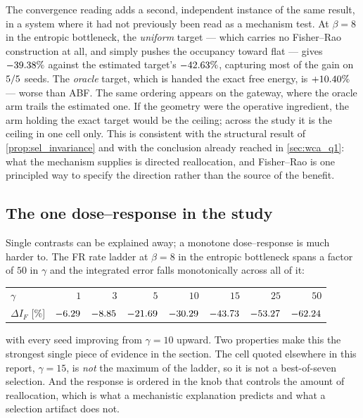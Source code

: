 The convergence reading adds a second, independent instance of the same result, in a system
where it had not previously been read as a mechanism test. At $\beta=8$ in the entropic
bottleneck, the \emph{uniform} target --- which carries no Fisher--Rao construction at all, and
simply pushes the occupancy toward flat --- gives $-39.38\%$ against the estimated target's
$-42.63\%$, capturing most of the gain on $5/5$ seeds. The
\emph{oracle} target, which is handed the exact free energy, is $+10.40\%$ --- worse than
ABF. The same ordering appears on the gateway, where the oracle arm trails the estimated one.
If the geometry were the operative ingredient, the arm holding the exact target would be the
ceiling; across the study it is the ceiling in one cell only. This is consistent with the
structural result of \cref{prop:sel_invariance} and with the conclusion already reached in
\cref{sec:wca_q1}: what the mechanism supplies is directed reallocation, and Fisher--Rao is one
principled way to specify the direction rather than the source of the benefit.

\subsection{The one dose--response in the study}
\label{sec:conv_dose}

Single contrasts can be explained away; a monotone dose--response is much harder to. The FR
rate ladder at $\beta=8$ in the entropic bottleneck spans a factor of $50$ in $\gamma$ and the
integrated error falls monotonically across all of it:

\begin{center}\small
\begin{tabular}{@{}lrrrrrrr@{}}
\toprule
$\gamma$ & $1$ & $3$ & $5$ & $10$ & $15$ & $25$ & $50$ \\
$\Delta I_F$ [\%] & $-6.29$ & $-8.85$ & $-21.69$ & $-30.29$ &
  $-43.73$ & $-53.27$ & $-62.24$ \\
\bottomrule
\end{tabular}
\end{center}

with every seed improving from $\gamma=10$ upward. Two properties make this the strongest
single piece of evidence in the section. The cell quoted elsewhere in this report,
$\gamma=15$, is \emph{not} the maximum of the ladder, so it is not a best-of-seven selection.
And the response is ordered in the knob that controls the amount of reallocation, which is
what a mechanistic explanation predicts and what a selection artifact does not.

